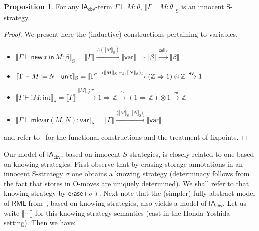 \documentclass{CSML}
\theoremstyle{definition}\newtheorem{definition}[thm]{Definition}
\theoremstyle{definition}\newtheorem{example}[thm]{Example}
\theoremstyle{definition}\newtheorem{proposition}[thm]{Proposition}
\theoremstyle{definition}\newtheorem{lemma}[thm]{Lemma}
\theoremstyle{definition}\newtheorem{theorem}[thm]{Theorem}
\theoremstyle{definition}\newtheorem{corollary}[thm]{Corollary}
\theoremstyle{definition}\newtheorem{remark}[thm]{Remark}
\newcommand\ev{\mathsf{ev}}
\newcommand\Erase[1]{\mathsf{erase}(#1)}
\newcommand\ang[1]{\langle#1\rangle}
\newcommand\cell{\mathsf{cell}}
\newcommand\Z{\mathbb{Z}}
\newcommand\iacbv{\mathsf{IA}_{\mathsf{cbv}}}
\newcommand\rml{\mathsf{RML}}
\newcommand\badvar[2]{\mathsf{mkvar}(#1,#2)}
\newcommand{\aasg}{\,\raisebox{0.065ex}{:}{=}\,}
\newcommand\comt{\mathsf{unit}}
\newcommand\Rarr{\Rightarrow}
\newcommand\expt{\mathsf{int}}
\newcommand\vart{\mathsf{var}}
\newcommand\cutout[1]{}
\newcommand\erase[1]{\Erase{#1}}
\newcommand\sem[1]{\llbracket #1 \rrbracket}
\newcommand\ssem[1]{\sem{#1}_{\mathrm{S}}}
\newcommand\seq[2]{{#1} \vdash {#2}}
\newcommand\new[2]{\mathsf{new}\,#1\,\mathsf{in}\,#2}
\begin{document}
\begin{proposition}\label{prop:model}
For any  $\iacbv$-term $\seq{\Gamma}{M:\theta}$,
$\ssem{\seq{\Gamma}{M:\theta}}$ is an innocent S-strategy. 
\end{proposition}
\begin{proof}
We present here the (inductive) constructions pertaining to variables, 
\begin{itemize}
\item
$\ssem{\seq{\Gamma}{\new{x}{M}:\beta}}=\sem{\Gamma}\xrightarrow{\Lambda(\ssem{M})}\sem{\vart}\Rarr\sem{\beta}\xrightarrow{\cell_\beta}\sem{\beta}
$
\item 
$\ssem{\seq{\Gamma}{M\aasg N:\comt}}=\sem{\Gamma}\xrightarrow{\ang{\ssem{M};\pi_2,\ssem{N}}_l}
(\Z\Rarr1)\otimes\Z\xrightarrow{\ev}1
$
\item
$\ssem{\seq{\Gamma}{!M}:\expt}=\sem{\Gamma}\xrightarrow{\ssem{M};\pi_1}
1\Rarr\Z\xrightarrow{\cong}(1\Rarr\Z)\otimes1\xrightarrow{\ev}\Z
$
\item
$\ssem{\seq{\Gamma}{\badvar{M}{N}:\vart}}=\sem{\Gamma}\xrightarrow{\ang{\ssem{M},\ssem{N}}_l}
\sem{\vart}
$
\end{itemize}
and refer to~\cite{HY97} for the functional constructions and the treatment of fixpoints.
\end{proof}

\cutout{With the soundness and definability results in place, we could now proceed in the familiar way to define a fully abstract model of $\iacbv$ via  taking the intrinsic quotient.
However, this would be somewhat counterproductive.
It turns out that $\rml$ is a conservative extension of $\iacbv$ (Corollary~\ref{cor:conservativity}),
so the (simpler) fully abstract model of $\rml$ from~\cite{AM97b}, based on knowing
strategies, is already fully abstract for $\iacbv$.
In fact, our model can be related to knowing strategies more precisely. Observe that by erasing
storage annotations in an innocent S-strategy $\sigma$ we obtain a knowing strategy,
which we call $\erase{\sigma}$ (determinism follows from the fact that stores in O-moves
are uniquely determined and from block-allocation). 
Let us write $\sem{\cdots}$
for the knowing strategy semantics (cast in~\cite{HY97}). 
}{Our model of $\iacbv$, based on innocent $S$-strategies, is closely related to one based on knowing strategies.
First observe that by erasing storage annotations in an innocent S-strategy $\sigma$ one obtains a knowing strategy
(determinacy follows from the fact that stores in O-moves are uniquely determined).
We shall refer to that knowing strategy by $\erase{\sigma}$.
Next note that the (simpler) fully abstract model of $\rml$ from~\cite{AM97b}, based on knowing strategies, also yields a model of $\iacbv$.
Let us write $\sem{\cdots}$
for this knowing-strategy semantics (cast in the Honda-Yoshida setting).
Then we have:}
\end{document}

